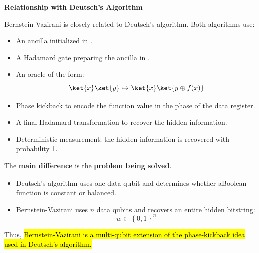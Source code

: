 \highspace
\begin{flushleft}
    \textcolor{Green3}{ \textbf{Relationship with Deutsch's Algorithm}}
\end{flushleft}
Bernstein-Vazirani is closely related to Deutsch's algorithm. Both algorithms use:
\begin{itemize}
    \item An ancilla initialized in .
    \item A Hadamard gate preparing the ancilla in \ket{-}.
    \item An oracle of the form:
    \begin{equation*}
        \ket{x}\ket{y} \mapsto \ket{x}\ket{y \oplus f(x)}
    \end{equation*}
    \item Phase kickback to encode the function value in the phase of the data register.
    \item A final Hadamard transformation to recover the hidden information.
    \item Deterministic measurement: the hidden information is recovered with probability 1.
\end{itemize}
The \textbf{main difference} is the \textbf{problem being solved}.
\begin{itemize}
    \item Deutsch's algorithm uses one data qubit and determines whether a\break Boolean function is constant or balanced.
    \item Bernstein-Vazirani uses $n$ data qubits and recovers an entire hidden bitstring:
    \begin{equation*}
        w \in \left\{0,1\right\}^n
    \end{equation*}
\end{itemize}
Thus, \hl{Bernstein-Vazirani is a multi-qubit extension of the phase-kickback idea used in Deutsch's algorithm.}

